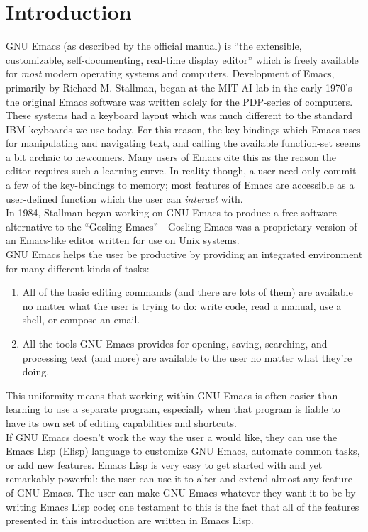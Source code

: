\documentclass[12pt,a4paper,oneside]{article}
\begin{document}
\section{Introduction}
GNU Emacs (as described by the official manual) is ``the extensible, customizable, self-documenting, real-time display editor'' which is freely available for \emph{most} modern operating systems and computers. Development of Emacs, primarily by Richard M. Stallman, began at the MIT AI lab in the early 1970's - the original Emacs software was written solely for the PDP-series of computers. These systems had a keyboard layout which was much different to the standard IBM keyboards we use today.  For this reason, the key-bindings which Emacs uses for manipulating and navigating text, and calling the available function-set seems a bit archaic to newcomers. Many users of Emacs cite this as the reason the editor requires such a learning curve.  In reality though, a user need only commit a few of the key-bindings to memory; most features of Emacs are accessible as a user-defined function which the user can \emph{interact} with.\\

In 1984, Stallman began working on GNU Emacs to produce a free software alternative to the ``Gosling Emacs'' - Gosling Emacs was a proprietary version of an Emacs-like editor written for use on Unix systems.\\

GNU Emacs helps the user be productive by providing an integrated environment for many different kinds of tasks:

\begin{enumerate}
  \item All of the basic editing commands (and there are lots of them) are available no matter what the user is trying to do: write code, read a manual, use a shell, or compose an email.
  \item All the tools GNU Emacs provides for opening, saving, searching, and processing text (and more) are available to the user no matter what they're doing.
\end{enumerate}

This uniformity means that working within GNU Emacs is often easier than learning to use a separate program, especially when that program is liable to have its own set of editing capabilities and shortcuts.\\

If GNU Emacs doesn't work the way the user a would like, they can use the Emacs Lisp (Elisp) language to customize GNU Emacs, automate common tasks, or add new features. Emacs Lisp is very easy to get started with and yet remarkably powerful: the user can use it to alter and extend almost any feature of GNU Emacs. The user can make GNU Emacs whatever they want it to be by writing Emacs Lisp code; one testament to this is the fact that all of the features presented in this introduction are written in Emacs Lisp.
\end{document}
